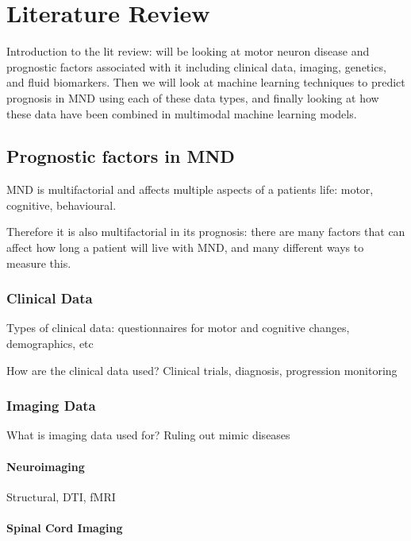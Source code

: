 \chapter{Literature Review}
\label{literature_review}

Introduction to the lit review: will be looking at motor neuron disease and prognostic factors associated with it including clinical data, imaging, genetics, and fluid biomarkers.
Then we will look at machine learning techniques to predict prognosis in MND using each of these data types, and finally looking at how these data have been combined in multimodal machine learning models.

\section{Prognostic factors in MND}

MND is multifactorial and affects multiple aspects of a patients life: motor, cognitive, behavioural.

Therefore it is also multifactorial in its prognosis: there are many factors that can affect how long a patient will live with MND, and many different ways to measure this.


\subsection{Clinical Data}

Types of clinical data: questionnaires for motor and cognitive changes, demographics, etc

How are the clinical data used? Clinical trials, diagnosis, progression monitoring

\subsection{Imaging Data}

What is imaging data used for? Ruling out mimic diseases

\subsubsection{Neuroimaging}

Structural, DTI, fMRI

\subsubsection{Spinal Cord Imaging}


